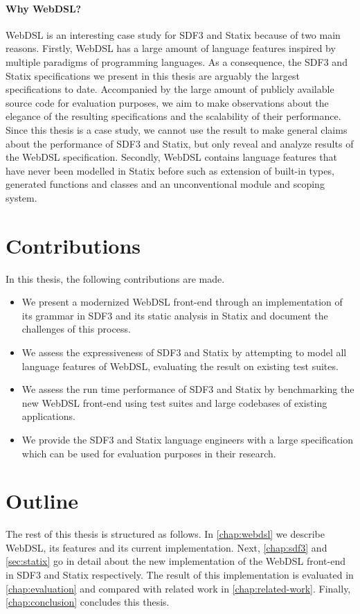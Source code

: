     \paragraph{Why WebDSL?} WebDSL is an interesting case study for SDF3 and Statix because of two main reasons. Firstly, WebDSL has a large amount of language features inspired by multiple paradigms of programming languages. As a consequence, the SDF3 and Statix specifications we present in this thesis are arguably the largest specifications to date. Accompanied by the large amount of publicly available source code for evaluation purposes, we aim to make observations about the elegance of the resulting specifications and the scalability of their performance. Since this thesis is a case study, we cannot use the result to make general claims about the performance of SDF3 and Statix, but only reveal and analyze results of the WebDSL specification. Secondly, WebDSL contains language features that have never been modelled in Statix before such as extension of built-in types, generated functions and classes and an unconventional module and scoping system.

  \section{\label{sec:contributions}Contributions}

    In this thesis, the following contributions are made.

    \begin{itemize}
      \item We present a modernized WebDSL front-end through an implementation of its grammar in SDF3 and its static analysis in Statix and document the challenges of this process.
      \item We assess the expressiveness of SDF3 and Statix by attempting to model all language features of WebDSL, evaluating the result on existing test suites.
      \item We assess the run time performance of SDF3 and Statix by benchmarking the new WebDSL front-end using test suites and large codebases of existing applications.
      \item We provide the SDF3 and Statix language engineers with a large specification which can be used for evaluation purposes in their research.
    \end{itemize}

  \section{\label{sec:outline}Outline}
    The rest of this thesis is structured as follows. In \cref{chap:webdsl} we describe WebDSL, its features and its current implementation. Next, \cref{chap:sdf3} and \cref{sec:statix} go in detail about the new implementation of the WebDSL front-end in SDF3 and Statix respectively. The result of this implementation is evaluated in \cref{chap:evaluation} and compared with related work in \cref{chap:related-work}. Finally, \cref{chap:conclusion} concludes this thesis.
